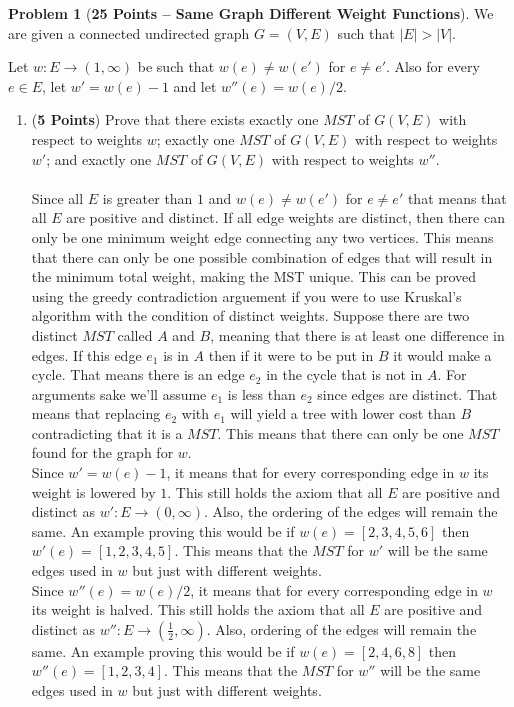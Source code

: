 \documentclass[11pt]{article}
\theoremstyle{definition}
\theoremstyle{theorem}
\newtheorem{prob}{Problem}
\begin{document}
\begin{prob}[\textbf{25 Points -- Same Graph Different Weight Functions}]
We are given a connected undirected graph $G=(V,E)$ such that $|E| > |V|$. 

Let $w:E\rightarrow (1,\infty)$ be such that $w(e)\not=w(e')$ for $e\neq e'$. Also for every $e \in E$, let $w'=w(e)-1$ and let $w''(e)=w(e)/2$.

\begin{enumerate}

    \item (\textbf{5 Points}) Prove that  there exists exactly one $MST$  of $G(V,E)$ with
      respect to weights $w$; exactly one  $MST$ of $G(V,E)$ with respect to
      weights $w'$;  and  exactly  one  $MST$  of  $G(V,E)$  with  respect  to
      weights $w''$. \\\\
      Since all $E$ is greater than $1$ and $w(e)\not=w(e')$ for $e\neq e'$ that means that all $E$ are positive and distinct. If all edge weights are distinct, then there can only be one minimum weight edge connecting any two vertices. This means that there can only be one possible combination of edges that will result in the minimum total weight, making the MST unique. This can be proved using the greedy contradiction arguement if you were to use Kruskal's algorithm with the condition of distinct weights. Suppose there are two distinct $MST$ called $A$ and $B$, meaning that there is at least one difference in edges. If this edge $e_{1}$ is in $A$ then if it were to be put in $B$ it would make a cycle. That means there is an edge $e_{2}$ in the cycle that is not in $A$. For arguments sake we'll assume $e_{1}$ is less than $e_{2}$ since edges are distinct. That means that replacing $e_{2}$ with $e_{1}$ will yield a tree with lower cost than $B$ contradicting that it is a $MST$. This means that there can only be one $MST$ found for the graph for $w$. \\
      Since $w'=w(e)-1$, it means that for every corresponding edge in $w$ its weight is lowered by $1$. This still holds the axiom that all $E$ are positive and distinct as $w':E\rightarrow (0,\infty)$. Also, the ordering of the edges will remain the same. An example proving this would be if $w(e)=[2, 3, 4, 5, 6]$ then $w'(e)=[1, 2, 3, 4, 5]$. This means that the $MST$ for $w'$ will be the same edges used in $w$ but just with different weights. \\
      Since $w''(e)=w(e)/2$, it means that for every corresponding edge in $w$ its weight is halved. This still holds the axiom that all $E$ are positive and distinct as $w'':E\rightarrow (\frac{1}{2},\infty)$. Also, ordering of the edges will remain the same. An example proving this would be if $w(e)=[2, 4, 6, 8]$ then $w''(e)=[1, 2, 3, 4]$. This means that the $MST$ for $w''$ will be the same edges used in $w$ but just with different weights. 


\end{enumerate}
\end{prob}
\end{document}
